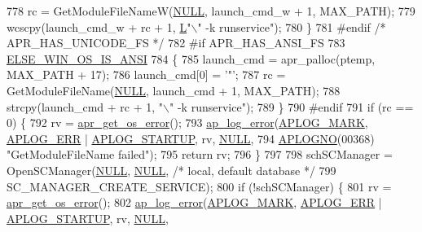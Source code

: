 \begin{DoxyCode}
{{778         rc = GetModuleFileNameW(\hyperlink{pcre_8txt_ad7f989d16aa8ca809a36bc392c07fba1}{NULL}, launch\_cmd\_w + 1, MAX\_PATH);
779         wcscpy(launch\_cmd\_w + rc + 1, \hyperlink{mod__lua_8h_a62f94dfc0036bec0c14106c2f15caf3e}{L}\textcolor{stringliteral}{"\(\backslash\)" -k runservice"});
780     \}
781 \textcolor{preprocessor}{#endif }\textcolor{comment}{/* APR\_HAS\_UNICODE\_FS */}\textcolor{preprocessor}{}
782 \textcolor{preprocessor}{#if APR\_HAS\_ANSI\_FS}
783     \hyperlink{win32_2apr__arch__misc_8h_a2d1423da7a6a46da1276017c8140be22}{ELSE\_WIN\_OS\_IS\_ANSI}
784     \{
785         launch\_cmd = apr\_palloc(ptemp, MAX\_PATH + 17);
786         launch\_cmd[0] = \textcolor{charliteral}{'"'};
787         rc = GetModuleFileName(\hyperlink{pcre_8txt_ad7f989d16aa8ca809a36bc392c07fba1}{NULL}, launch\_cmd + 1, MAX\_PATH);
788         strcpy(launch\_cmd + rc + 1, \textcolor{stringliteral}{"\(\backslash\)" -k runservice"});
789     \}
790 \textcolor{preprocessor}{#endif}
791     \textcolor{keywordflow}{if} (rc == 0) \{
792         rv = \hyperlink{group__apr__errno_gaa76e122da00af0ce2e8c8d7ff538bdfa}{apr\_get\_os\_error}();
793         \hyperlink{group__APACHE__CORE__LOG_ga5e6676c87418af7a1d323a116c78ecb4}{ap\_log\_error}(\hyperlink{group__APACHE__CORE__LOG_ga655e126996849bcb82e4e5a14c616f4a}{APLOG\_MARK}, \hyperlink{group__APACHE__CORE__LOG_ga57ad94ed8c92c4306de90479251a5d58}{APLOG\_ERR} | 
      \hyperlink{group__APACHE__CORE__LOG_ga39efd19b052fb6f39d8f263c16cc82b7}{APLOG\_STARTUP}, rv, \hyperlink{pcre_8txt_ad7f989d16aa8ca809a36bc392c07fba1}{NULL},
794                      \hyperlink{group__APACHE__CORE__LOG_ga1dee8a07e06bc5b3de8b89662c2cd666}{APLOGNO}(00368) \textcolor{stringliteral}{"GetModuleFileName failed"});
795         \textcolor{keywordflow}{return} rv;
796     \}
797 
798     schSCManager = OpenSCManager(\hyperlink{pcre_8txt_ad7f989d16aa8ca809a36bc392c07fba1}{NULL}, \hyperlink{pcre_8txt_ad7f989d16aa8ca809a36bc392c07fba1}{NULL}, \textcolor{comment}{/* local, default database */}
799                                  SC\_MANAGER\_CREATE\_SERVICE);
800     \textcolor{keywordflow}{if} (!schSCManager) \{
801         rv = \hyperlink{group__apr__errno_gaa76e122da00af0ce2e8c8d7ff538bdfa}{apr\_get\_os\_error}();
802         \hyperlink{group__APACHE__CORE__LOG_ga5e6676c87418af7a1d323a116c78ecb4}{ap\_log\_error}(\hyperlink{group__APACHE__CORE__LOG_ga655e126996849bcb82e4e5a14c616f4a}{APLOG\_MARK}, \hyperlink{group__APACHE__CORE__LOG_ga57ad94ed8c92c4306de90479251a5d58}{APLOG\_ERR} | 
      \hyperlink{group__APACHE__CORE__LOG_ga39efd19b052fb6f39d8f263c16cc82b7}{APLOG\_STARTUP}, rv, \hyperlink{pcre_8txt_ad7f989d16aa8ca809a36bc392c07fba1}{NULL},
}}
\end{DoxyCode}
